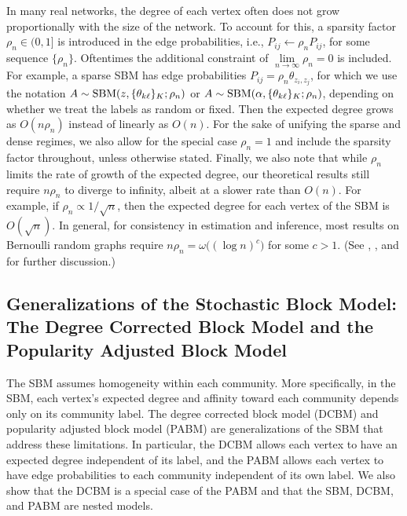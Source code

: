 \documentclass[
  12pt,
]{article}
\theoremstyle{definition}
\theoremstyle{definition}
\theoremstyle{definition}
\theoremstyle{definition}
\theoremstyle{remark}
\begin{document}
In many real networks, the degree of each vertex often does not grow proportionally with the size of the network.
To account for this, a sparsity factor \(\rho_n \in (0, 1]\) is introduced in the edge probabilities, i.e., \(P_{ij} \leftarrow \rho_n P_{ij}\), for some sequence \(\{\rho_n\}\).
Oftentimes the additional constraint of \(\lim\limits_{n \to \infty} \rho_n = 0\) is included.
For example, a sparse SBM has edge probabilities \(P_{ij} = \rho_n \theta_{z_i, z_j}\), for which we use the notation \(A \sim \mathrm{SBM}(z, \{\theta_{k \ell}\}_K; \rho_n)\) or \(A \sim \mathrm{SBM}(\alpha, \{\theta_{k \ell}\}_K; \rho_n)\), depending on whether we treat the labels as random or fixed.
Then the expected degree grows as \(O(n \rho_n)\) instead of linearly as \(O(n)\).
For the sake of unifying the sparse and dense regimes, we also allow for the special case \(\rho_n = 1\) and include the sparsity factor throughout, unless otherwise stated.
Finally, we also note that while \(\rho_n\) limits the rate of growth of the expected degree, our theoretical results still require \(n \rho_n\) to diverge to infinity, albeit at a slower rate than \(O(n)\).
For example, if \(\rho_n \propto 1 / \sqrt{n}\), then the expected degree for each vertex of the SBM is \(O(\sqrt{n})\).
In general, for consistency in estimation and inference, most results on Bernoulli random graphs require \(n \rho_n = \omega \big( (\log n)^c \big)\) for some \(c > 1\).
(See \cite{JMLR:v18:16-480}, \cite{https://doi.org/10.48550/arxiv.2106.09840}, and \cite{rubindelanchy2017statistical} for further discussion.)

\hypertarget{sec:dcbm-pabm}{%
\subsection{Generalizations of the Stochastic Block Model: The Degree Corrected Block Model and the Popularity Adjusted Block Model}\label{sec:dcbm-pabm}}

The SBM assumes homogeneity within each community.
More specifically, in the SBM, each vertex's expected degree and affinity toward each community depends only on its community label.
The degree corrected block model (DCBM) and popularity adjusted block model (PABM) are generalizations of the SBM that address these limitations.
In particular, the DCBM allows each vertex to have an expected degree independent of its label, and the PABM allows each vertex to have edge probabilities to each community independent of its own label.
We also show that the DCBM is a special case of the PABM and that the SBM, DCBM, and PABM are nested models.
\end{document}
